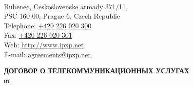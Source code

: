 

\begin{Form}
  \begin{raggedleft}
    \parbox{10cm}{
    \textbf{\large{\ipxpname}}\\
    Bubenec, Ceskoslovenske armady 371/11,\\
    PSC 160 00, Prague 6, Czech Republic\\
    Telephone: \href{callto:+420226020300}{+420 226 020 300}\\
    Fax: \href{callto:+420226020301}{+420 226 020 301}\\
    Web: \href{http://www.ipxp.net}{http://www.ipxp.net}\\
    E-mail: \href{mailto:agreements@ipxp.net}{agreements@ipxp.net}\\
    }\hfill
  \end{raggedleft}
  \baselineskip
  \begin{center}
   \textbf{\Large{ДОГОВОР О ТЕЛЕКОММУНИКАЦИОННЫХ УСЛУГАХ}}\\
    от \underline{\TextField[name=contractdate,charsize=10pt,width=5em,height=1em,borderwidth=0,
    bordercolor={1 1 1},align=0]{}} \No~\underline{\TextField[name=contractnum,charsize=10pt,width=6em,height=1em,borderwidth=0,
    bordercolor={1 1 1},align=0]{}}
  \end{center}


\end{Form}
